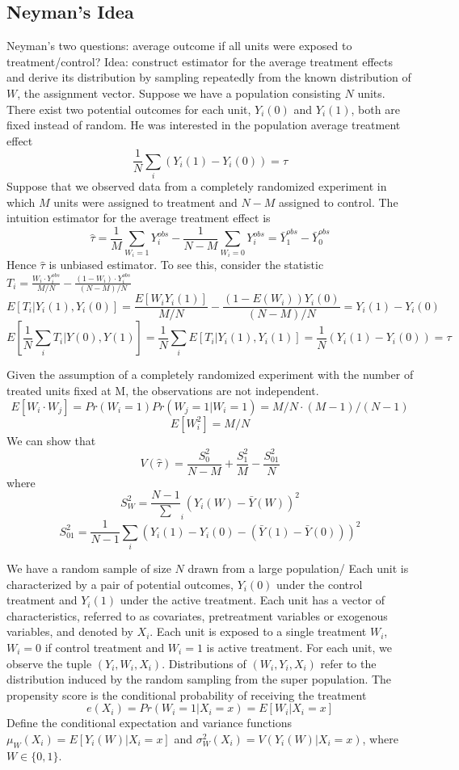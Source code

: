 \documentclass[11pt, a4paper, oneside]{article}
\theoremstyle{definition}
\theoremstyle{proposition}
\theoremstyle{corollary}
\theoremstyle{lemma}
\theoremstyle{theorem}
\begin{document}
\subsection{Neyman's Idea}
Neyman's two questions: average outcome if all units were exposed to treatment/control? Idea: construct estimator for the average treatment effects and derive its distribution by sampling repeatedly from the known distribution of $W$, the assignment vector. Suppose we have a population consisting $N$ units. There exist two potential outcomes for each unit, $Y_i(0)$ and $Y_i(1)$, both are fixed instead of random. He was interested in the population average treatment effect
$$\frac{1}{N}\sum_i (Y_i(1)- Y_i(0)) = \tau$$ 
Suppose that we observed data from a completely randomized experiment in which $M$ units were assigned to treatment and $N - M$ assigned to control. The intuition estimator for the average treatment effect is
$$\hat{\tau} = \frac{1}{M}\sum_{W_i=1} Y_i^{obs} - \frac{1}{N- M}\sum_{W_i = 0} Y_i^{obs} = \bar{Y}_1^{obs} - \bar{Y}_0^{obs}$$
Hence $\hat{\tau}$ is unbiased estimator. To see this, consider the statistic $T_i = \frac{W_i\cdot Y_i^{obs}}{M/N} - \frac{(1 - W_i)\cdot Y_i^{obs}}{(N- M)/N}$
$$E[T_i|Y_i(1), Y_i(0)] = \frac{E[W_iY_i(1)]}{M/N} - \frac{(1-E(W_i))Y_i(0)}{(N-M)/N}= Y_i(1) - Y_i(0)$$ 
$$E[\frac{1}{N}\sum_i T_i|Y(0), Y(1)] = \frac{1}{N}\sum_i E[T_i|Y_i(1), Y_i(1)] = \frac{1}{N}(Y_i(1) - Y_i(0)) = \tau$$ 

Given the assumption of a completely randomized experiment with the number of treated units fixed at M, the observations are not independent.
$$E[W_i\cdot W_j] = Pr(W_i= 1)Pr(W_j = 1|W_i= 1) = M/N\cdot (M -1)/(N-1)$$
$$E[W_i^2] = M/N$$ 
We can show that $$V(\hat{\tau}) = \frac{S_0^2}{N- M} + \frac{S_1^2}{M} -\frac{S_{01}^2}{N}$$
where
$$S_W^2 = \frac{N-1}\sum_i(Y_i(W)- \bar{Y}(W))^2$$
$$S_{01}^2 = \frac{1}{N-1}\sum_i(Y_i(1) - Y_i(0) - (\bar{Y}(1) - \bar{Y}(0)))^2$$

We have a random sample of size $N$ drawn from a large population/ Each unit is characterized by a pair of potential outcomes, $Y_i(0)$ under the control treatment and $Y_i(1)$ under the active treatment. Each unit has a vector of characteristics, referred to as covariates, pretreatment variables or exogenous variables, and denoted by $X_i$. Each unit is exposed to a single treatment $W_i$, $W_i=0$ if control treatment and $W_i= 1$ is active treatment. For each unit, we observe the tuple $(Y_i, W_i, X_i)$. Distributions of $(W_i, Y_i, X_i)$ refer to the distribution induced by the random sampling from the super population. The propensity score is the conditional probability of receiving the treatment $$e(X_i) = Pr(W_i=1| X_i=x) = E[W_i|X_i = x]$$
Define the conditional expectation and variance functions
$\mu_W(X_i) = E[Y_i(W)|X_i = x]$ and $\sigma^2_W(X_i) = V(Y_i(W)|X_i = x)$, where $W\in \{0, 1\}$. 
\end{document}
